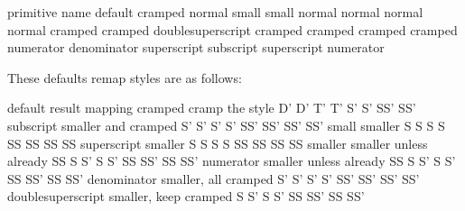 \starttabulate
\FL
\BC primitive name                        \BC default \NC \NR
\TL
\NC \type {\Umathoverlinevariant}           \NC cramped           \NC \NR
\NC \type {\Umathunderlinevariant}          \NC normal            \NC \NR
\NC \type {\Umathoverdelimitervariant}      \NC small             \NC \NR
\NC \type {\Umathunderdelimitervariant}     \NC small             \NC \NR
\NC \type {\Umathdelimiterovervariant}      \NC normal            \NC \NR
\NC \type {\Umathdelimiterundervariant}     \NC normal            \NC \NR
\NC \type {\Umathhextensiblevariant}        \NC normal            \NC \NR
\NC \type {\Umathvextensiblevariant}        \NC normal            \NC \NR
\NC \type {\Umathfractionvariant}           \NC cramped           \NC \NR
\NC \type {\Umathradicalvariant}            \NC cramped           \NC \NR
\NC \type {\Umathdegreevariant}             \NC doublesuperscript \NC \NR
\NC \type {\Umathaccentvariant}             \NC cramped           \NC \NR
\NC \type {\Umathtopaccentvariant}          \NC cramped           \NC \NR
\NC \type {\Umathbottomaccentvariant}       \NC cramped           \NC \NR
\NC \type {\Umathoverlayaccentvariant}      \NC cramped           \NC \NR
\NC \type {\Umathnumeratorvariant}          \NC numerator         \NC \NR
\NC \type {\Umathdenominatorvariant}        \NC denominator       \NC \NR
\NC \type {\Umathsuperscriptvariant}        \NC superscript       \NC \NR
\NC \type {\Umathsubscriptvariant}          \NC subscript         \NC \NR
\NC \type {\Umathprimevariant}              \NC superscript       \NC \NR
\NC \type {\Umathstackvariant}              \NC numerator         \NC \NR
\LL
\stoptabulate

These defaults remap styles are as follows:

\starttabulate[|Tl|l|l|]
\FL
\BC default           \BC result                    \BC mapping \NC \NR
\TB
\NC cramped           \NC cramp the style           \NC D' D' T' T' S'  S'  SS' SS' \NC \NR
\NC subscript         \NC smaller and cramped       \NC S' S' S' S' SS' SS' SS' SS' \NC \NR
\NC small             \NC smaller                   \NC S  S  S  S  SS  SS  SS  SS  \NC \NR
\NC superscript       \NC smaller                   \NC S  S  S  S  SS  SS  SS  SS  \NC \NR
\NC smaller           \NC smaller unless already SS \NC S  S' S  S' SS  SS' SS  SS' \NC \NR
\NC numerator         \NC smaller unless already SS \NC S  S' S  S' SS  SS' SS  SS' \NC \NR
\NC denominator       \NC smaller, all cramped      \NC S' S' S' S' SS' SS' SS' SS' \NC \NR
\NC doublesuperscript \NC smaller, keep cramped     \NC S  S' S  S' SS  SS' SS  SS' \NC \NR
\LL
\stoptabulate

